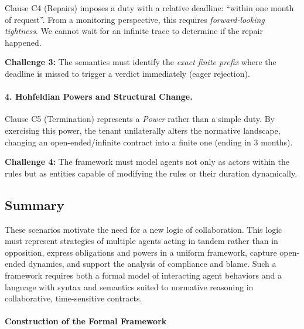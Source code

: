 Clause C4 (Repairs) imposes a duty with a relative deadline: ``within one month of request''. From a monitoring perspective, this requires \emph{forward-looking tightness}. We cannot wait for an infinite trace to determine if the repair happened.

\textbf{Challenge 3:} The semantics must identify the \emph{exact finite prefix} where the deadline is missed to trigger a verdict immediately (eager rejection).



\paragraph{4. Hohfeldian Powers and Structural Change.}

Clause C5 (Termination) represents a \emph{Power} rather than a simple duty. By exercising this power, the tenant unilaterally alters the normative landscape, changing an open-ended/infinite contract into a finite one (ending in 3 months).

\textbf{Challenge 4:} The framework must model agents not only as actors within the rules but as entities capable of modifying the rules or their duration dynamically.



\subsection*{Summary}

These scenarios motivate the need for a new logic of collaboration. This logic must represent strategies of multiple agents acting in tandem rather than in opposition, express obligations and powers in a uniform framework, capture open-ended dynamics, and support the analysis of compliance and blame. Such a framework requires both a formal model of interacting agent behaviors and a language with syntax and semantics suited to normative reasoning in collaborative, time-sensitive contracts.



\paragraph{Construction of the Formal Framework}

